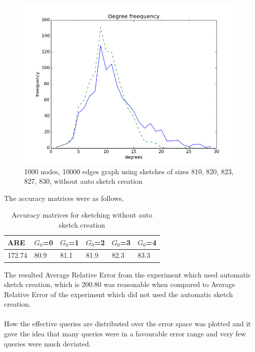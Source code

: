 \documentclass[12pt]{report}
\numberwithin{figure}{section}
\numberwithin{table}{section}
\begin{document}
\begin{figure}[H]
\centering
\includegraphics[scale=0.6]{images/MS-n1000-e10000-sketches-811-821-823-827-829plot}
\caption{1000 nodes, 10000 edges graph using sketches of sizes 810, 820, 823, 827, 830, without auto sketch creation}
\end{figure}

The accuracy matrices were as follows,

\begin{table}[H]
\centering
\begin{tabular}{|l|l|l|l|l|l|}
\hline
 ARE   & $G_0$=0 & $G_0$=1 & $G_0$=2 & $G_0$=3 & $G_0$=4\\ \hline
172.74 &   80.9  &   81.1  &   81.9  &   82.3  & 83.3   \\ \hline
\end{tabular}
\caption{Accuracy matrices for sketching without auto sketch creation}
\end{table}

The resulted Average Relative Error from the experiment which used automatic sketch creation, which is 200.80 was reasonable when compared to Average Relative Error  of the experiment which did not used the automatic sketch creation. 

\paragraph{}

How the effective queries are distributed over the error space was plotted and it gave the idea that many queries were in a favourable error range and very few queries were much deviated.
\end{document}
